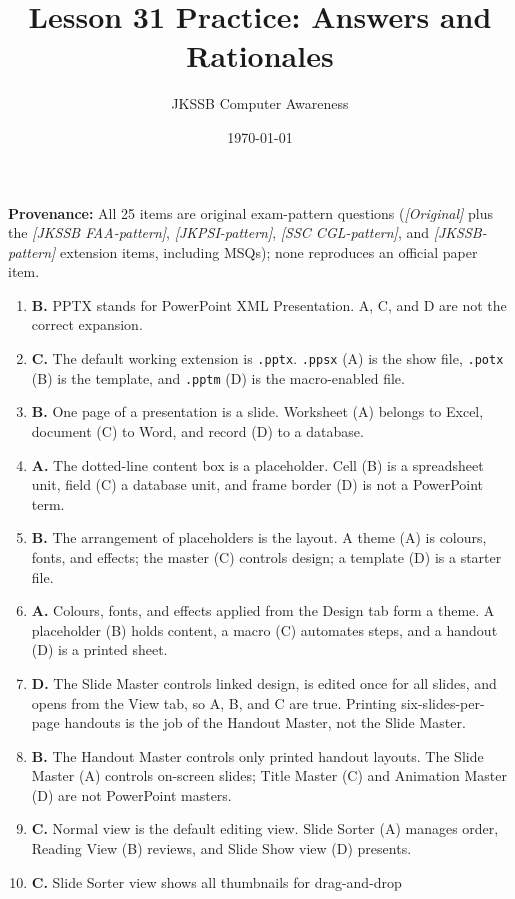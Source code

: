 \documentclass[11pt]{article}
\title{Lesson 31 Practice: Answers and Rationales}
\author{JKSSB Computer Awareness}
\date{\today}
\begin{document}
\maketitle
\noindent\textbf{Provenance:} All 25 items are original exam-pattern questions (\textit{[Original]} plus the \textit{[JKSSB FAA-pattern]}, \textit{[JKPSI-pattern]}, \textit{[SSC CGL-pattern]}, and \textit{[JKSSB-pattern]} extension items, including MSQs); none reproduces an official paper item.
\begin{enumerate}[label=\textbf{Q\arabic*.}, leftmargin=*]
\item \textbf{B.} PPTX stands for PowerPoint XML Presentation. A, C, and D
  are not the correct expansion.
\item \textbf{C.} The default working extension is \texttt{.pptx}.
  \texttt{.ppsx} (A) is the show file, \texttt{.potx} (B) is the template,
  and \texttt{.pptm} (D) is the macro-enabled file.
\item \textbf{B.} One page of a presentation is a slide. Worksheet (A)
  belongs to Excel, document (C) to Word, and record (D) to a database.
\item \textbf{A.} The dotted-line content box is a placeholder. Cell (B) is
  a spreadsheet unit, field (C) a database unit, and frame border (D) is not
  a PowerPoint term.
\item \textbf{B.} The arrangement of placeholders is the layout. A theme (A)
  is colours, fonts, and effects; the master (C) controls design; a template
  (D) is a starter file.
\item \textbf{A.} Colours, fonts, and effects applied from the Design tab
  form a theme. A placeholder (B) holds content, a macro (C) automates
  steps, and a handout (D) is a printed sheet.
\item \textbf{D.} The Slide Master controls linked design, is edited once
  for all slides, and opens from the View tab, so A, B, and C are true.
  Printing six-slides-per-page handouts is the job of the Handout Master,
  not the Slide Master.
\item \textbf{B.} The Handout Master controls only printed handout layouts.
  The Slide Master (A) controls on-screen slides; Title Master (C) and
  Animation Master (D) are not PowerPoint masters.
\item \textbf{C.} Normal view is the default editing view. Slide Sorter (A)
  manages order, Reading View (B) reviews, and Slide Show view (D) presents.
\item \textbf{C.} Slide Sorter view shows all thumbnails for drag-and-drop

\end{enumerate}
\end{document}
